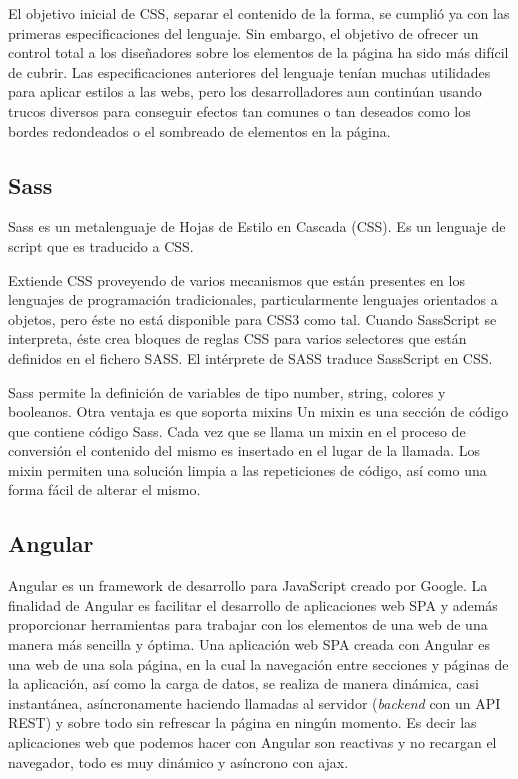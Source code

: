 \documentclass[a4paper, 12pt]{book}
\begin{document}
El objetivo inicial de CSS, separar el contenido de la forma, se cumpli\'o ya con las primeras
especificaciones del lenguaje. Sin embargo, el objetivo de ofrecer un control total a los dise\~nadores
sobre los elementos de la p\'agina ha sido m\'as dif\'icil de cubrir. Las especificaciones anteriores
del lenguaje ten\'ian muchas utilidades para aplicar estilos a las webs, pero los desarrolladores
aun contin\'uan usando trucos diversos para conseguir efectos tan comunes o tan deseados como
los bordes redondeados o el sombreado de elementos en la p\'agina.


\subsection{Sass}
\label{subsec:estilo}

Sass \cite{Sass}  es un metalenguaje de Hojas de Estilo en Cascada (CSS). Es un lenguaje de script que
es traducido a CSS.

Extiende CSS proveyendo de varios mecanismos que est\'an presentes en los lenguajes de
programaci\'on tradicionales, particularmente lenguajes orientados a objetos, pero \'este no est\'a
disponible para CSS3 como tal. Cuando SassScript se interpreta, \'este crea bloques de reglas CSS
para varios selectores que est\'an definidos en el fichero SASS. El int\'erprete de SASS traduce
SassScript en CSS.

Sass permite la definici\'on de variables de tipo number, string, colores y booleanos. Otra
ventaja es que soporta mixins Un mixin es una secci\'on de c\'odigo que contiene c\'odigo Sass.
Cada vez que se llama un mixin en el proceso de conversi\'on el contenido del mismo es insertado
en el lugar de la llamada. Los mixin permiten una soluci\'on limpia a las repeticiones de c\'odigo,
as\'i como una forma f\'acil de alterar el mismo.


\subsection{Angular}
\label{subsec:estilo}

Angular\cite{Angular} es un framework de desarrollo para JavaScript creado por Google. La finalidad de Angular es facilitar el desarrollo de aplicaciones web SPA y adem\'as proporcionar herramientas para trabajar con los elementos de una web de una manera m\'as sencilla y \'optima. Una aplicaci\'on web SPA creada con Angular es una web de una sola p\'agina, en la cual la navegaci\'on entre secciones y p\'aginas de la aplicaci\'on, as\'i como la carga de datos, se realiza de manera din\'amica, casi instant\'anea, as\'incronamente haciendo llamadas al servidor (\emph{backend} con un API REST) y sobre todo sin refrescar la p\'agina en ning\'un momento. Es decir las aplicaciones web que podemos hacer con Angular son reactivas y no recargan el navegador, todo es muy din\'amico y as\'incrono con ajax.
\end{document}
